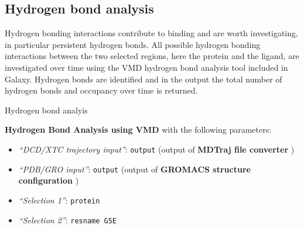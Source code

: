 \documentclass[twocolumn]{bmcart}%
\providecommand{\tightlist}{%
  \setlength{\itemsep}{0pt}\setlength{\parskip}{0pt}}
\begin{document}
\hypertarget{hydrogen-bond-analysis}{%
\subsection*{Hydrogen bond analysis}\label{hydrogen-bond-analysis}}

Hydrogen bonding interactions contribute to binding and are worth investigating, in particular persistent hydrogen bonds. All possible hydrogen bonding interactions between the two selected regions, here the protein and the ligand, are investigated over time using the VMD hydrogen bond analysis tool included in Galaxy. Hydrogen bonds are identified and in the output the total number of hydrogen bonds and  occupancy over time is returned.

\begin{handson_box_colour}{Hydrogen bond analyis}

  \textbf{Hydrogen Bond Analysis using VMD} with the following
  parameters:

  \begin{itemize}
  \tightlist
  \item
    \emph{``DCD/XTC trajectory input''}: \texttt{output} (output of
    \textbf{MDTraj file converter} )
  \item
    \emph{``PDB/GRO input''}: \texttt{output} (output of \textbf{GROMACS
    structure configuration} )
  \item
    \emph{``Selection 1''}: \texttt{protein}
  \item
    \emph{``Selection 2''}: \texttt{resname\ G5E}
  \end{itemize}



\end{handson_box_colour}
\end{document}
